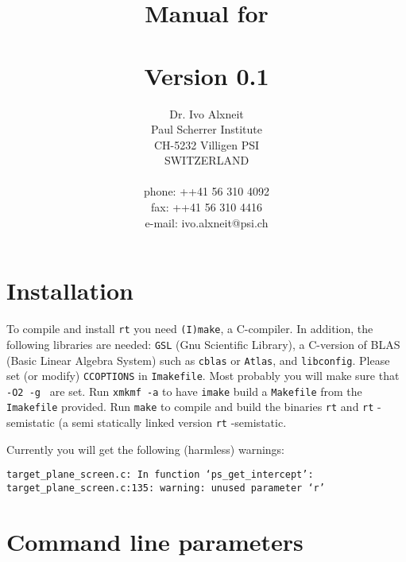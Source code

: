 \documentclass[10pt,a4paper,titlepage]{article}
\title{ {\Huge Manual for \\
		\rt \\
		Version 0.1 \\
		\vspace{2cm}}}
\author{Dr. Ivo Alxneit \\
	Paul Scherrer Institute \\
	CH-5232 Villigen PSI \\
	SWITZERLAND \\
	\\
	phone: ++41 56 310 4092 \\
	fax: ++41 56 310 4416 \\
	e-mail: ivo.alxneit@psi.ch \\
	\vspace{4cm}}
\newcommand{\rt}{{\tt rt} }
\begin{document}
\maketitle

\tableofcontents
\pagebreak

\setcounter{page}{1}



\section{Installation}

To compile and install \rt you need {\tt (I)make}, a C-compiler. In addition, the following libraries are needed: {\tt GSL} (Gnu Scientific Library), a C-version of BLAS (Basic Linear Algebra System) such as {\tt cblas} or {\tt Atlas}, and {\tt libconfig}. Please set (or modify) {\tt CCOPTIONS} in {\tt Imakefile}. Most probably you will make sure that {\tt -O2 -g } are set. Run {\tt xmkmf -a} to have {\tt imake} build a {\tt Makefile} from the {\tt Imakefile} provided. Run {\tt make} to compile and build the binaries \rt and {\rt-semistatic} (a semi statically linked version {\rt-semistatic}.

Currently you will get the following (harmless) warnings:

\begin{verbatim}
target_plane_screen.c: In function ‘ps_get_intercept’:
target_plane_screen.c:135: warning: unused parameter ‘r’
\end{verbatim}



\section{Command line parameters}
\end{document}
